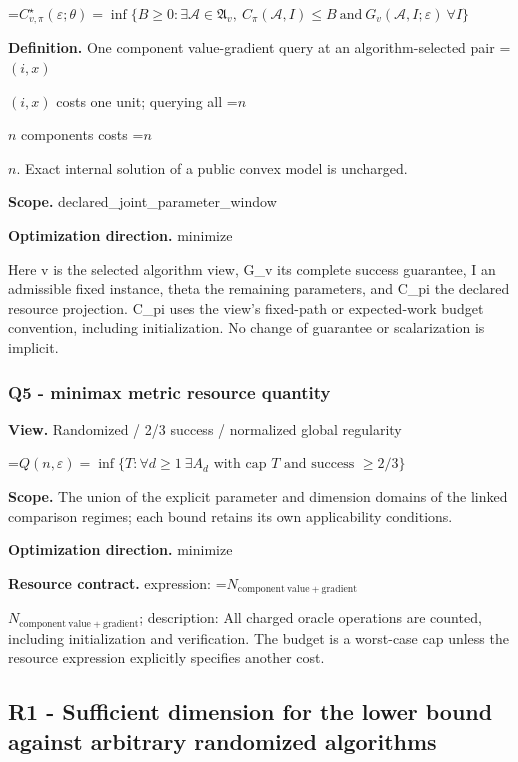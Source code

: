 \documentclass[10pt,a4paper]{article}
\newcommand{\AtlasMath}[1]{\par\begingroup\centering\setbox0=\hbox{$\displaystyle #1$}\ifdim\wd0>1.4\linewidth\typeout{ATLAS WIDE FORMULA: \the\wd0}\fi\ifdim\wd0>\linewidth\resizebox{\linewidth}{!}{\box0}\else\box0\fi\par\endgroup}
\newcommand{\AtlasInlineMath}[1]{\begingroup\setbox0=\hbox{$#1$}\ifdim\wd0>.4\linewidth\endgroup\AtlasMath{#1}\else\endgroup$#1$\fi}
\begin{document}
\AtlasMath{C^\star_{v,\pi}(\varepsilon;\theta)=\inf\{B\ge0:\exists\mathcal A\in\mathfrak A_v,\ C_\pi(\mathcal A,I)\le B\ \text{and}\ G_v(\mathcal A,I;\varepsilon)\ \forall I\}}


\textbf{Definition.} One component value-gradient query at an algorithm-selected pair \AtlasInlineMath{(i,x)} costs one unit; querying all \AtlasInlineMath{n} components costs \AtlasInlineMath{n}. Exact internal solution of a public convex model is uncharged.



\textbf{Scope.} declared\_joint\_parameter\_window



\textbf{Optimization direction.} minimize



Here v is the selected algorithm view, G\_v its complete success guarantee, I an admissible fixed instance, theta the remaining parameters, and C\_pi the declared resource projection. C\_pi uses the view's fixed-path or expected-work budget convention, including initialization. No change of guarantee or scalarization is implicit.



\subsubsection{Q5 - minimax metric resource quantity}


\textbf{View.} Randomized / 2/3 success / normalized global regularity



\AtlasMath{Q(n,\varepsilon)=\inf\{T:\forall d\ge1\ \exists A_d\text{ with cap }T\text{ and success }\ge2/3\}}


\textbf{Scope.} The union of the explicit parameter and dimension domains of the linked comparison regimes; each bound retains its own applicability conditions.



\textbf{Optimization direction.} minimize



\textbf{Resource contract.} expression: \AtlasInlineMath{N_{\mathrm{component\ value+gradient}}}; description: All charged oracle operations are counted, including initialization and verification. The budget is a worst-case cap unless the resource expression explicitly specifies another cost.



\subsection{R1 - Sufficient dimension for the lower bound against arbitrary randomized algorithms}
\end{document}
